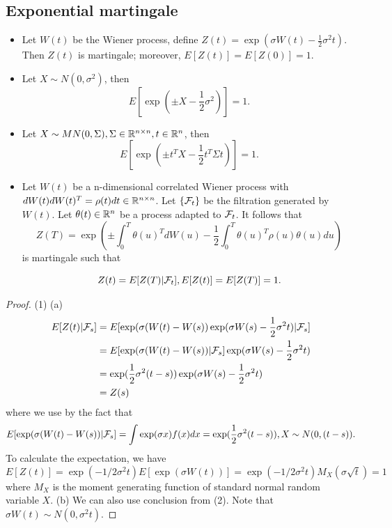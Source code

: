 \begin{refsection}
\subsection{Exponential martingale}
\begin{lemma}\label{ch:theory-of-stochastic-process:th:exponentialmartingalelemma}\hfill
\begin{itemize}
	\item 	
Let $W(t)$ be the Wiener process, define $Z(t) = \exp(\sigma W(t) - \frac{1}{2}\sigma^2 t)$.
Then $Z(t)$ is martingale; moreover, $E[Z(t)] = E[Z(0)] = 1$.

	\item Let $X\sim N(0,\sigma^2)$, then
	$$E[\exp(\pm X - \frac{1}{2}\sigma^2)] = 1.$$
	\item Let $X\sim MN(0, \Sigma), \Sigma \in \mathbb{R}^{n\times n}, t\in \mathbb{R}^n $, then
	$$E[\exp(\pm t^TX - \frac{1}{2}t^T\Sigma t)] = 1.$$
	\item Let $W(t)$ be a n-dimensional correlated Wiener process with $dW(t)dW(t)^T = \rho(t) dt \in \mathbb{R}^{n\times n} $. Let $\{\mathcal{F}_t\}$ be the filtration generated by $W(t)$. Let $\theta(t)\in \mathbb{R}^n$ be a process adapted to $\mathcal{F}_t$.  It follows that
	$$Z(T) = \exp(\pm \int_0^T \theta(u)^T dW(u) -\frac{1}{2}\int_0^T \theta(u)^T \rho(u) \theta(u) du)$$
	is martingale such that
	
	$$Z(t) = E[Z(T)|\mathcal{F}_t], E[Z(t)] = E[Z(T)] = 1.$$
	 
\end{itemize}
\end{lemma}
\begin{proof}
(1)	(a)
\begin{align*}
    E[Z(t)|\mathcal{F}_s] &= E[\exp(\sigma (W(t)-W(s)) \exp(\sigma W(s) -  \frac{1}{2}\sigma^2 t)|\mathcal{F}_s] \\
    & = E[\exp(\sigma (W(t)-W(s)) |\mathcal{F}_s] \exp(\sigma W(s)  - \frac{1}{2}\sigma^2 t) \\
    & = \exp(\frac{1}{2}\sigma^2 (t-s)) \exp(\sigma W(s)  - \frac{1}{2}\sigma^2 t)\\
    & = Z(s)
\end{align*}
where we use by the fact that $$E[\exp(\sigma (W(t)-W(s)) |\mathcal{F}_s] = \int \exp(\sigma x) f(x) dx = \exp(\frac{1}{2}\sigma^2 (t-s)), X\sim N(0,(t-s)).$$
To calculate the expectation, we have
$$E[Z(t)] = \exp(-1/2\sigma^2 t) E[\exp(\sigma W(t))] = \exp(-1/2\sigma^2 t) M_X(\sigma \sqrt{t}) = 1 $$
where $M_X$ is the moment generating function of standard normal random variable $X$.
(b)
We can also use conclusion from (2). Note that $\sigma W(t) \sim N(0, \sigma^2 t)$. 


\end{proof}
\end{refsection}

